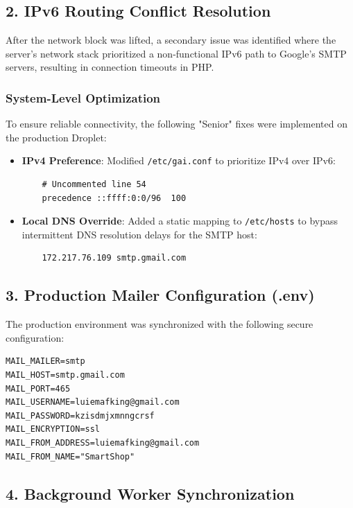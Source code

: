 \documentclass[12pt,a4paper]{article}
\begin{document}
\subsection{2. IPv6 Routing Conflict Resolution}

After the network block was lifted, a secondary issue was identified where the server's network stack prioritized a non-functional IPv6 path to Google's SMTP servers, resulting in connection timeouts in PHP.

\subsubsection{System-Level Optimization}
To ensure reliable connectivity, the following "Senior" fixes were implemented on the production Droplet:

\begin{itemize}
    \item \textbf{IPv4 Preference}: Modified \texttt{/etc/gai.conf} to prioritize IPv4 over IPv6:
    \begin{verbatim}
    # Uncommented line 54
    precedence ::ffff:0:0/96  100
    \end{verbatim}
    \item \textbf{Local DNS Override}: Added a static mapping to \texttt{/etc/hosts} to bypass intermittent DNS resolution delays for the SMTP host:
    \begin{verbatim}
    172.217.76.109 smtp.gmail.com
    \end{verbatim}
\end{itemize}

\subsection{3. Production Mailer Configuration (.env)}

The production environment was synchronized with the following secure configuration:

\begin{verbatim}
MAIL_MAILER=smtp
MAIL_HOST=smtp.gmail.com
MAIL_PORT=465
MAIL_USERNAME=luiemafking@gmail.com
MAIL_PASSWORD=kzisdmjxmnngcrsf
MAIL_ENCRYPTION=ssl
MAIL_FROM_ADDRESS=luiemafking@gmail.com
MAIL_FROM_NAME="SmartShop"
\end{verbatim}

\subsection{4. Background Worker Synchronization}
\end{document}
